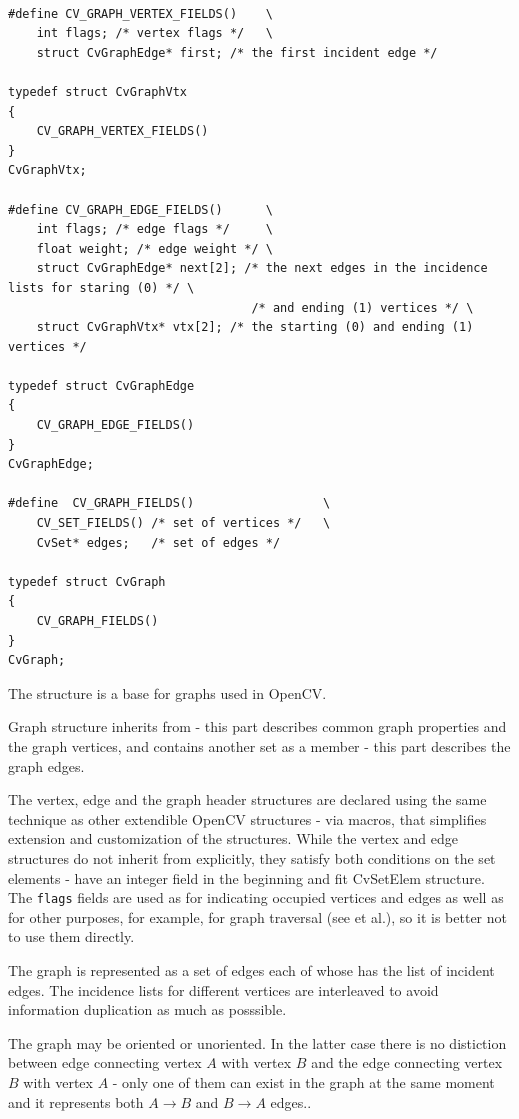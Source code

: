 \begin{lstlisting}

#define CV_GRAPH_VERTEX_FIELDS()    \
    int flags; /* vertex flags */   \
    struct CvGraphEdge* first; /* the first incident edge */

typedef struct CvGraphVtx
{
    CV_GRAPH_VERTEX_FIELDS()
}
CvGraphVtx;

#define CV_GRAPH_EDGE_FIELDS()      \
    int flags; /* edge flags */     \
    float weight; /* edge weight */ \
    struct CvGraphEdge* next[2]; /* the next edges in the incidence lists for staring (0) */ \
                                  /* and ending (1) vertices */ \
    struct CvGraphVtx* vtx[2]; /* the starting (0) and ending (1) vertices */

typedef struct CvGraphEdge
{
    CV_GRAPH_EDGE_FIELDS()
}
CvGraphEdge;

#define  CV_GRAPH_FIELDS()                  \
    CV_SET_FIELDS() /* set of vertices */   \
    CvSet* edges;   /* set of edges */

typedef struct CvGraph
{
    CV_GRAPH_FIELDS()
}
CvGraph;

\end{lstlisting}

The structure  is a base for graphs used in OpenCV.

Graph structure inherits from  - this part describes common graph properties and the graph vertices, and contains another set as a member - this part describes the graph edges.

The vertex, edge and the graph header structures are declared using the
same technique as other extendible OpenCV structures - via macros, that
simplifies extension and customization of the structures. While the vertex
and edge structures do not inherit from  explicitly, they
satisfy both conditions on the set elements - have an integer field in
the beginning and fit CvSetElem structure. The \texttt{flags} fields are
used as for indicating occupied vertices and edges as well as for other
purposes, for example, for graph traversal (see \cross{CreateGraphScanner}
et al.), so it is better not to use them directly.

The graph is represented as a set of edges each of whose has the list of
incident edges. The incidence lists for different vertices are interleaved
to avoid information duplication as much as posssible.

The graph may be oriented or unoriented. In the latter case there is no
distiction between edge connecting vertex $A$ with vertex $B$ and the edge
connecting vertex $B$ with vertex $A$ - only one of them can exist in the
graph at the same moment and it represents both $A \rightarrow B$ and
$B \rightarrow A$ edges..

